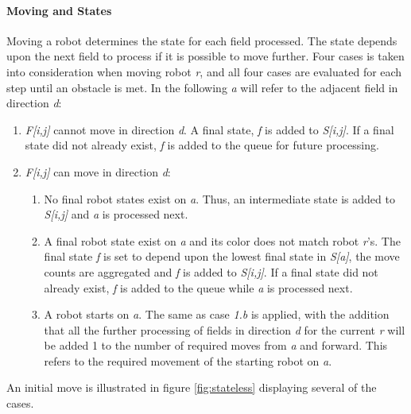 \documentclass[]{article}
\providecommand{\tightlist}{%
  \setlength{\itemsep}{0pt}\setlength{\parskip}{0pt}}
\let\oldparagraph\paragraph
\renewcommand{\paragraph}[1]{\oldparagraph{#1}\mbox{}}
\begin{document}
\paragraph{Moving and States}\label{moving-and-states}

Moving a robot determines the state for each field processed. The state
depends upon the next field to process if it is possible to move
further. Four cases is taken into consideration when moving robot
\emph{r}, and all four cases are evaluated for each step until an
obstacle is met. In the following \emph{a} will refer to the adjacent
field in direction \emph{d}:

\begin{enumerate}
\def\labelenumi{\arabic{enumi}.}
\tightlist
\item
  \emph{F{[}i,j{]}} cannot move in direction \emph{d}. A final state,
  \emph{f} is added to \emph{S{[}i,j{]}}. If a final state did not
  already exist, \emph{f} is added to the queue for future processing.
\item
  \emph{F{[}i,j{]}} can move in direction \emph{d}:

  \begin{enumerate}
  \def\labelenumii{\alph{enumii}.}
  \tightlist
  \item
    No final robot states exist on \emph{a}. Thus, an intermediate state
    is added to \emph{S{[}i,j{]}} and \emph{a} is processed next.
  \item
    A final robot state exist on \emph{a} and its color does not match
    robot \emph{r}'s. The final state \emph{f} is set to depend upon the
    lowest final state in \emph{S{[}a{]}}, the move counts are
    aggregated and \emph{f} is added to \emph{S{[}i,j{]}}. If a final
    state did not already exist, \emph{f} is added to the queue while
    \emph{a} is processed next.
  \item
    A robot starts on \emph{a}. The same as case \emph{1.b} is applied,
    with the addition that all the further processing of fields in
    direction \emph{d} for the current \emph{r} will be added 1 to the
    number of required moves from \emph{a} and forward. This refers to
    the required movement of the starting robot on \emph{a}.
  \end{enumerate}
\end{enumerate}

An initial move is illustrated in figure \ref{fig:stateless} displaying
several of the cases.
\end{document}
